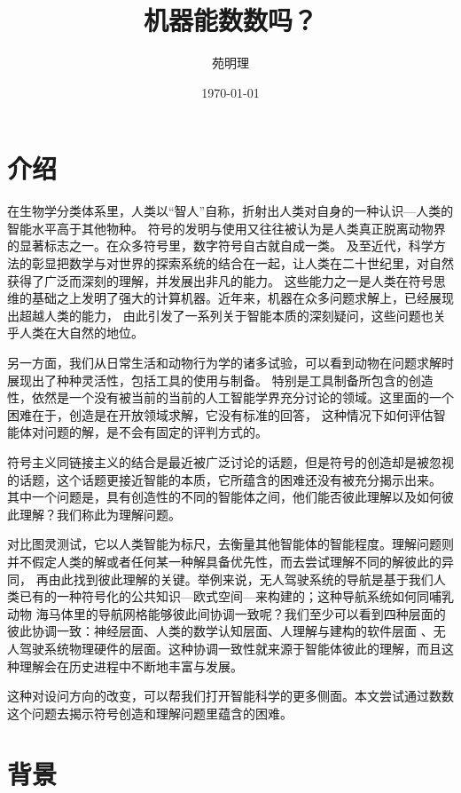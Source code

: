 \documentclass[a4paper,12pt]{article}
\title{机器能数数吗？}
\author{苑明理}
\date{\monthyeardate\today}
\begin{document}
\begingroup
\let\newpage\relax
\maketitle
\endgroup

\renewcommand\contentsname{目录}
\setcounter{tocdepth}{2}
\tableofcontents

\newpage

\section{介绍}

在生物学分类体系里，人类以“智人”自称，折射出人类对自身的一种认识—人类的智能水平高于其他物种。
符号的发明与使用又往往被认为是人类真正脱离动物界的显著标志之一。在众多符号里，数字符号自古就自成一类。
及至近代，科学方法的彰显把数学与对世界的探索系统的结合在一起，让人类在二十世纪里，对自然获得了广泛而深刻的理解，并发展出非凡的能力。
这些能力之一是人类在符号思维的基础之上发明了强大的计算机器。近年来，机器在众多问题求解上，已经展现出超越人类的能力，
由此引发了一系列关于智能本质的深刻疑问，这些问题也关乎人类在大自然的地位。

另一方面，我们从日常生活和动物行为学的诸多试验，可以看到动物在问题求解时展现出了种种灵活性，包括工具的使用与制备。
特别是工具制备所包含的创造性，依然是一个没有被当前的当前的人工智能学界充分讨论的领域。这里面的一个困难在于，创造是在开放领域求解，它没有标准的回答，
这种情况下如何评估智能体对问题的解，是不会有固定的评判方式的。

符号主义同链接主义的结合是最近被广泛讨论的话题，但是符号的创造却是被忽视的话题，这个话题更接近智能的本质，它所蕴含的困难还没有被充分揭示出来。
其中一个问题是，具有创造性的不同的智能体之间，他们能否彼此理解以及如何彼此理解？我们称此为理解问题。

对比图灵测试，它以人类智能为标尺，去衡量其他智能体的智能程度。理解问题则并不假定人类的解或者任何某一种解具备优先性，而去尝试理解不同的解彼此的异同，
再由此找到彼此理解的关键。举例来说，无人驾驶系统的导航是基于我们人类已有的一种符号化的公共知识—欧式空间—来构建的；这种导航系统如何同哺乳动物
海马体里的导航网格能够彼此间协调一致呢？我们至少可以看到四种层面的彼此协调一致：神经层面、人类的数学认知层面、人理解与建构的软件层面
、无人驾驶系统物理硬件的层面。这种协调一致性就来源于智能体彼此的理解，而且这种理解会在历史进程中不断地丰富与发展。

这种对设问方向的改变，可以帮我们打开智能科学的更多侧面。本文尝试通过数数这个问题去揭示符号创造和理解问题里蕴含的困难。


\section{背景}
\end{document}
